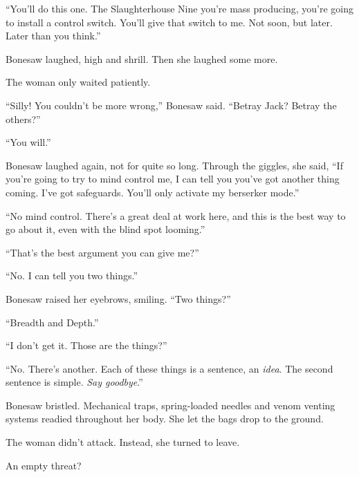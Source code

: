 ``You'll do this one.  The Slaughterhouse Nine you're mass producing, you're going to install a control switch.  You'll give that switch to me.  Not soon, but later.  Later than you think.''



Bonesaw laughed, high and shrill.  Then she laughed some more.



The woman only waited patiently.



``Silly!  You couldn't be more wrong,'' Bonesaw said.  ``Betray Jack?  Betray the others?''



``You will.''



Bonesaw laughed again, not for quite so long.  Through the giggles, she said, ``If you're going to try to mind control me, I can tell you you've got another thing coming.  I've got safeguards.  You'll only activate my berserker mode.''



``No mind control.  There's a great deal at work here, and this is the best way to go about it, even with the blind spot looming.''



``That's the best argument you can give me?''



``No.  I can tell you two things.''



Bonesaw raised her eyebrows, smiling.  ``Two things?''



``Breadth and Depth.''



``I don't get it.  Those are the things?''



``No.  There's another.  Each of these things is a sentence, an \emph{idea}.  The second sentence is simple.  \emph{Say goodbye}.''



Bonesaw bristled.  Mechanical traps, spring-loaded needles and venom venting systems readied throughout her body.  She let the bags drop to the ground.



The woman didn't attack.  Instead, she turned to leave.



An empty threat?



